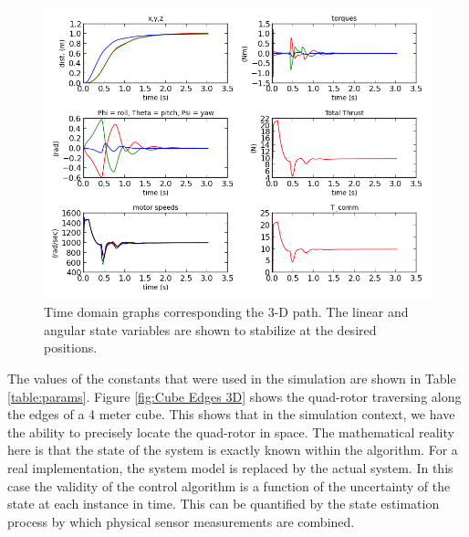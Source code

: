 \begin{figure}[htbp]
	\centering
		\includegraphics[scale = 0.5]{Figures/typical_run_time_domain.png}
	\caption[Time domain graphs corresponding the 3-D path. The linear and angular state variables are shown to stabilize at the desired positions. ]{Time domain graphs corresponding the 3-D path. The linear and angular state variables are shown to stabilize at the desired positions. }
	\label{fig:Typical Run Time Domain}
\end{figure}
The values of the constants that were used in the simulation are shown in Table \ref{table:params}. Figure \ref{fig:Cube Edges 3D} shows the quad-rotor traversing along the edges of a 4 meter cube. This shows that in the simulation context, we have the ability to precisely locate the quad-rotor in space. The mathematical reality here is that the state of the system is exactly known within the algorithm. For a real implementation, the system model is replaced by the actual system. In this case the validity of the control algorithm is a function of the uncertainty of the state at each instance in time. This can be quantified by the state estimation process by which physical sensor measurements are combined.
